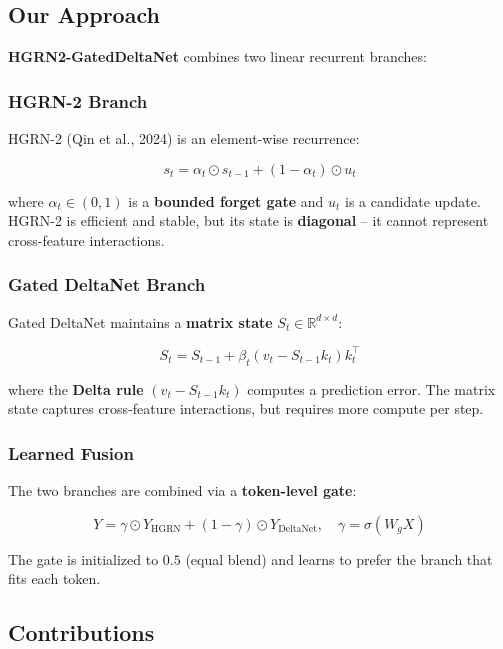 \subsection{Our Approach}

\textbf{HGRN2-GatedDeltaNet} combines two linear recurrent branches:

\subsubsection{HGRN-2 Branch}

HGRN-2 (Qin et al., 2024) is an element-wise recurrence:

\[
s_t = \alpha_t \odot s_{t-1} + (1 - \alpha_t) \odot u_t
\tag{1.1}
\]

where $\alpha_t \in (0, 1)$ is a \textbf{bounded forget gate} and $u_t$ is a 
candidate update. HGRN-2 is efficient and stable, but its state is 
\textbf{diagonal} -- it cannot represent cross-feature interactions.

\subsubsection{Gated DeltaNet Branch}

Gated DeltaNet maintains a \textbf{matrix state} $S_t \in \mathbb{R}^{d \times d}$:

\[
S_t = S_{t-1} + \beta_t (v_t - S_{t-1} k_t) k_t^\top
\tag{1.2}
\]

where the \textbf{Delta rule} $(v_t - S_{t-1} k_t)$ computes a prediction error. 
The matrix state captures cross-feature interactions, but requires more 
compute per step.

\subsubsection{Learned Fusion}

The two branches are combined via a \textbf{token-level gate}:

\[
Y = \gamma \odot Y_\text{HGRN} + (1 - \gamma) \odot Y_\text{DeltaNet}, \quad
\gamma = \sigma(W_g X)
\tag{1.3}
\]

The gate is initialized to $0.5$ (equal blend) and learns to prefer the 
branch that fits each token.

\subsection{Contributions}


